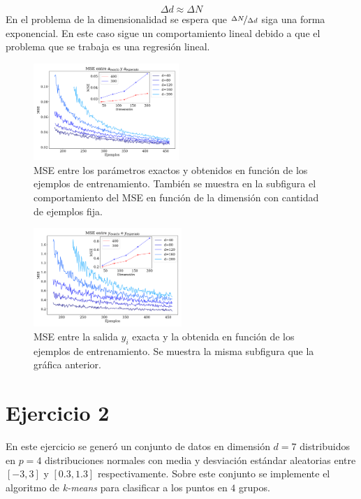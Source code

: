 \begin{equation}
    \Delta d \approx \Delta N  
\end{equation}
En el problema  de la dimensionalidad se espera que $\nicefrac{\Delta N}{\Delta  d}$ siga una forma exponencial. En este caso sigue un comportamiento lineal debido a que el problema que se trabaja es una regresión lineal. 



    \begin{figure}[H]
        \centering
        \includegraphics[width=0.49\textwidth]{plots/ejer_1_mse_a_ejemplos.pdf}
        \caption{MSE entre los parámetros exactos y obtenidos en función de los ejemplos de entrenamiento. También se muestra en la subfigura el comportamiento del MSE en función de la dimensión con cantidad de ejemplos fija.}
        \label{fig:ejer1_a_ejemplos}
    \end{figure}


    \begin{figure}[H]
        \centering
        \includegraphics[width=0.5\textwidth]{plots/ejer_1_mse_y_ejemplos.pdf}
        \caption{MSE entre la salida $y_i$ exacta y la obtenida en función de los ejemplos de entrenamiento. Se  muestra la misma subfigura que la gráfica anterior.}
        \label{fig:ejer1_y_ejemplos}
    \end{figure}

    \section*{Ejercicio 2}

    En este ejercicio se generó un conjunto de datos en dimensión $d=7$ distribuidos en $p=4$ distribuciones normales con media y desviación estándar aleatorias entre $[-3, 3]$ y $[0.3,1.3]$ respectivamente.   Sobre este conjunto se implemente el algoritmo de \emph{k-means} para clasificar a los puntos en $4$ grupos.
    
